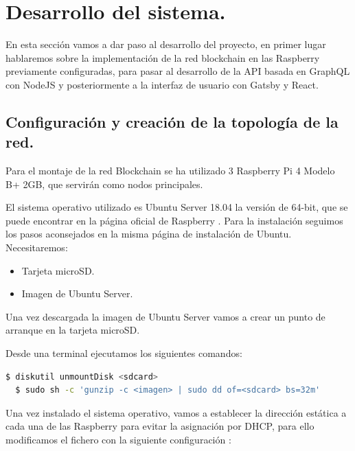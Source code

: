 \section{Desarrollo del sistema.}

En esta sección vamos a dar paso al desarrollo del proyecto, en primer lugar hablaremos sobre la implementación de la red
blockchain en las Raspberry previamente configuradas, para pasar al desarrollo de la API basada en GraphQL con NodeJS y 
posteriormente a la interfaz de usuario con Gatsby y React.  

\subsection{Configuración y creación de la topología de la red.}

Para el montaje de la red Blockchain se ha utilizado 3 Raspberry Pi 4 Modelo B+ 2GB, que servirán como nodos principales.

\vspace{5mm}

\noindent El sistema operativo utilizado es Ubuntu Server 18.04 \cite{ubuntu-rasp} la versión de 64-bit, que se puede 
encontrar en la página oficial de Raspberry \cite{rasp-official-page}. Para la instalación seguimos los pasos aconsejados 
en la misma página de instalación de Ubuntu. Necesitaremos:

\begin{itemize}
  \item Tarjeta microSD.
  \item Imagen de Ubuntu Server.
\end{itemize}

\noindent Una vez descargada la imagen de Ubuntu Server vamos a crear un punto de arranque en la tarjeta microSD.

\vspace{5mm}

\noindent Desde una terminal ejecutamos los siguientes comandos:

\begin{lstlisting}[language=bash]
  $ diskutil unmountDisk <sdcard>
  $ sudo sh -c 'gunzip -c <imagen> | sudo dd of=<sdcard> bs=32m'
\end{lstlisting}

\noindent Una vez instalado el sistema operativo, vamos a establecer la dirección estática a cada una de las Raspberry
para evitar la asignación por DHCP, para ello modificamos el fichero  con la 
siguiente configuración \cite{configure-static-ip}:

